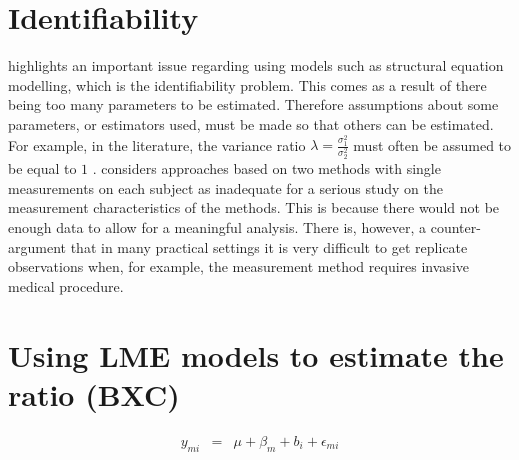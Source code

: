 \documentclass[12pt, a4paper]{report}
\theoremstyle{plain}
\theoremstyle{definition}
\theoremstyle{remark}
\begin{document}
\section{Identifiability}
\citet{DunnSEME} highlights an important issue regarding using models such as structural equation modelling, which is the identifiability problem. This comes as a
result of there being too many parameters to be estimated. Therefore assumptions about some parameters, or estimators used, must be made so that others can be estimated. For example, in the literature, the variance ratio $\lambda=\frac{\sigma^{2}_{1}}{\sigma^{2}_{2}}$
must often be assumed to be equal to $1$ \citep{linnet98}. \citet{DunnSEME} considers approaches based on two methods with single measurements on each subject as inadequate for a serious
study on the measurement characteristics of the methods. This is because there would not be enough data to allow for a meaningful
analysis. There is, however, a counter-argument that in many practical settings it is very difficult to get replicate observations when, for example, the measurement method requires invasive medical
procedure.









\section{Using LME models to estimate the ratio (BXC) }

\begin{eqnarray*}
	y_{mi} &=& \mu + \beta_{m} + b_{i} + \epsilon_{mi}\\
\end{eqnarray*}
\end{document}
